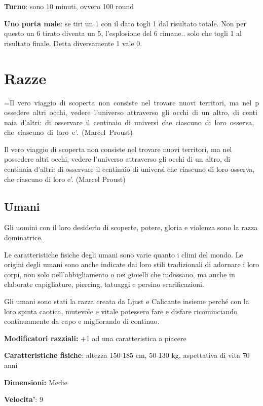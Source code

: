 \documentclass[a4paper,11pt,twoside,openany]{book}
\makeatletter
\newcommand{\mybox}[1]{%
	\setbox0=\hbox{#1}%
	\setlength{\@tempdima}{\dimexpr\wd0+13pt}%
	\begin{tcolorbox}[boxrule=0.5pt,arc=4pt, breakable,enhanced,
		left=6pt,right=6pt,top=6pt,bottom=6pt,boxsep=0pt,width=\@tempdima]
		#1
	\end{tcolorbox}
}
\makeatother
\begin{document}
\textbf{Turno}: sono 10 minuti, ovvero 100 round

\textbf{Uno porta male}: se tiri un 1 con il dato togli 1 dal risultato totale. Non per questo un 6 tirato diventa un 5, l’esplosione del 6 rimane.. solo che togli 1 al risultato finale. Detta diversamente 1 vale 0.



\pagebreak


\section{Razze}

\mybox{Il vero viaggio di scoperta non consiste nel trovare nuovi territori, ma nel possedere altri occhi, vedere l'universo attraverso gli occhi di un altro, di centinaia d'altri: di osservare il centinaio di universi che ciascuno di loro osserva, che ciascuno di loro e'. (Marcel Proust)}\medskip


\subsection{Umani}

Gli uomini con il loro desiderio di scoperte, potere, gloria e violenza sono la razza dominatrice.

Le caratteristiche fisiche degli umani sono varie quanto i climi del mondo. Le origini degli umani sono anche indicate dai loro stili tradizionali di adornare i loro corpi, non solo nell'abbigliamento o nei gioielli che indossano, ma anche in elaborate capigliature, piercing, tatuaggi e persino scarificazioni.

Gli umani sono stati la razza creata da Ljust e Calicante insieme perché con la loro spinta caotica, mutevole e vitale potessero fare e disfare ricominciando continuamente da capo e migliorando di continuo.

\textbf{Modificatori razziali:} +1 ad una caratteristica a piacere

\textbf{Caratteristiche fisiche}: altezza 150-185 cm, 50-130 kg, aspettativa di vita 70 anni

\textbf{Dimensioni:} Medie

\textbf{Velocita'}: 9
\end{document}
